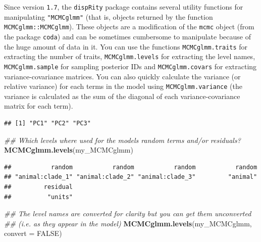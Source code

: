 \documentclass[
]{book}
\newenvironment{Shaded}{\begin{snugshade}}{\end{snugshade}}
\newcommand{\CommentTok}[1]{\textcolor[rgb]{0.56,0.35,0.01}{\textit{#1}}}
\newcommand{\DataTypeTok}[1]{\textcolor[rgb]{0.13,0.29,0.53}{#1}}
\newcommand{\KeywordTok}[1]{\textcolor[rgb]{0.13,0.29,0.53}{\textbf{#1}}}
\newcommand{\NormalTok}[1]{#1}
\newcommand{\OperatorTok}[1]{\textcolor[rgb]{0.81,0.36,0.00}{\textbf{#1}}}
\newcommand{\OtherTok}[1]{\textcolor[rgb]{0.56,0.35,0.01}{#1}}
\newcommand{\StringTok}[1]{\textcolor[rgb]{0.31,0.60,0.02}{#1}}
\begin{document}
Since version \texttt{1.7}, the \texttt{dispRity} package contains several utility functions for manipulating \texttt{"MCMCglmm"} (that is, objects returned by the function \texttt{MCMCglmm::MCMCglmm}).
These objects are a modification of the \texttt{mcmc} object (from the package \texttt{coda}) and can be sometimes cumbersome to manipulate because of the huge amount of data in it.
You can use the functions \texttt{MCMCglmm.traits} for extracting the number of traits, \texttt{MCMCglmm.levels} for extracting the level names, \texttt{MCMCglmm.sample} for sampling posterior IDs and \texttt{MCMCglmm.covars} for extracting variance-covariance matrices. You can also quickly calculate the variance (or relative variance) for each terms in the model using \texttt{MCMCglmm.variance} (the variance is calculated as the sum of the diagonal of each variance-covariance matrix for each term).

\begin{Shaded}
\end{Shaded}

\begin{verbatim}
## [1] "PC1" "PC2" "PC3"
\end{verbatim}

\begin{Shaded}
\begin{Highlighting}[]
\CommentTok{\#\# Which levels where used for the model\textquotesingle{}s random terms and/or residuals?}
\KeywordTok{MCMCglmm.levels}\NormalTok{(my\_MCMCglmm)}
\end{Highlighting}
\end{Shaded}

\begin{verbatim}
##           random           random           random           random 
## "animal:clade_1" "animal:clade_2" "animal:clade_3"         "animal" 
##         residual 
##          "units"
\end{verbatim}

\begin{Shaded}
\begin{Highlighting}[]
\CommentTok{\#\# The level names are converted for clarity but you can get them unconverted}
\CommentTok{\#\# (i.e. as they appear in the model)}
\KeywordTok{MCMCglmm.levels}\NormalTok{(my\_MCMCglmm, }\DataTypeTok{convert =} \OtherTok{FALSE}\NormalTok{)}
\end{Highlighting}
\end{Shaded}
\end{document}
